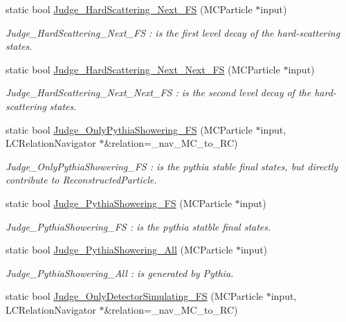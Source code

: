 \begin{DoxyCompactItemize}
static bool \hyperlink{classToolSet_1_1CMC_af28ed4c00c5b936aa0660253bd4af35b}{Judge\_\-HardScattering\_\-Next\_\-FS} (MCParticle $\ast$input)
\begin{DoxyCompactList}\small\item\em Judge\_\-HardScattering\_\-Next\_\-FS : is the first level decay of the hard-\/scattering states. \item\end{DoxyCompactList}\item 
static bool \hyperlink{classToolSet_1_1CMC_a20029373a30ff4642dfbe5ac879ee0ff}{Judge\_\-HardScattering\_\-Next\_\-Next\_\-FS} (MCParticle $\ast$input)
\begin{DoxyCompactList}\small\item\em Judge\_\-HardScattering\_\-Next\_\-Next\_\-FS : is the second level decay of the hard-\/scattering states. \item\end{DoxyCompactList}\item 
static bool \hyperlink{classToolSet_1_1CMC_a839156529c555e8d0484286295288604}{Judge\_\-OnlyPythiaShowering\_\-FS} (MCParticle $\ast$input, LCRelationNavigator $\ast$\&relation=\_\-nav\_\-MC\_\-to\_\-RC)
\begin{DoxyCompactList}\small\item\em Judge\_\-OnlyPythiaShowering\_\-FS : is the pythia stable final states, but directly contribute to ReconstructedParticle. \item\end{DoxyCompactList}\item 
static bool \hyperlink{classToolSet_1_1CMC_a47f5a5aff7196a77a729c703ffed1ce7}{Judge\_\-PythiaShowering\_\-FS} (MCParticle $\ast$input)
\begin{DoxyCompactList}\small\item\em Judge\_\-PythiaShowering\_\-FS : is the pythia statble final states. \item\end{DoxyCompactList}\item 
static bool \hyperlink{classToolSet_1_1CMC_a6c340bf257a238e9f68cd251b50599cd}{Judge\_\-PythiaShowering\_\-All} (MCParticle $\ast$input)
\begin{DoxyCompactList}\small\item\em Judge\_\-PythiaShowering\_\-All : is generated by Pythia. \item\end{DoxyCompactList}\item 
static bool \hyperlink{classToolSet_1_1CMC_a158579bb5adfcfa9e0b4bbaba7ee3229}{Judge\_\-OnlyDetectorSimulating\_\-FS} (MCParticle $\ast$input, LCRelationNavigator $\ast$\&relation=\_\-nav\_\-MC\_\-to\_\-RC)

\end{DoxyCompactItemize}
